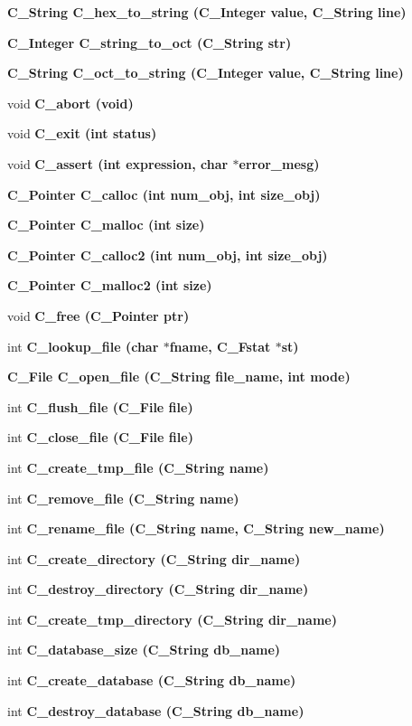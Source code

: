 \begin{CompactItemize}
\bf{C\_\-String} \bf{C\_\-hex\_\-to\_\-string} (\bf{C\_\-Integer} value, \bf{C\_\-String} line)
\item 
\bf{C\_\-Integer} \bf{C\_\-string\_\-to\_\-oct} (\bf{C\_\-String} str)
\item 
\bf{C\_\-String} \bf{C\_\-oct\_\-to\_\-string} (\bf{C\_\-Integer} value, \bf{C\_\-String} line)
\item 
void \bf{C\_\-abort} (void)
\item 
void \bf{C\_\-exit} (int status)
\item 
void \bf{C\_\-assert} (int expression, char $\ast$error\_\-mesg)
\item 
\bf{C\_\-Pointer} \bf{C\_\-calloc} (int num\_\-obj, int size\_\-obj)
\item 
\bf{C\_\-Pointer} \bf{C\_\-malloc} (int size)
\item 
\bf{C\_\-Pointer} \bf{C\_\-calloc2} (int num\_\-obj, int size\_\-obj)
\item 
\bf{C\_\-Pointer} \bf{C\_\-malloc2} (int size)
\item 
void \bf{C\_\-free} (\bf{C\_\-Pointer} ptr)
\item 
int \bf{C\_\-lookup\_\-file} (char $\ast$\bf{fname}, \bf{C\_\-Fstat} $\ast$st)
\item 
\bf{C\_\-File} \bf{C\_\-open\_\-file} (\bf{C\_\-String} file\_\-name, int \bf{mode})
\item 
int \bf{C\_\-flush\_\-file} (\bf{C\_\-File} \bf{file})
\item 
int \bf{C\_\-close\_\-file} (\bf{C\_\-File} \bf{file})
\item 
int \bf{C\_\-create\_\-tmp\_\-file} (\bf{C\_\-String} \bf{name})
\item 
int \bf{C\_\-remove\_\-file} (\bf{C\_\-String} \bf{name})
\item 
int \bf{C\_\-rename\_\-file} (\bf{C\_\-String} \bf{name}, \bf{C\_\-String} new\_\-name)
\item 
int \bf{C\_\-create\_\-directory} (\bf{C\_\-String} dir\_\-name)
\item 
int \bf{C\_\-destroy\_\-directory} (\bf{C\_\-String} dir\_\-name)
\item 
int \bf{C\_\-create\_\-tmp\_\-directory} (\bf{C\_\-String} dir\_\-name)
\item 
int \bf{C\_\-database\_\-size} (\bf{C\_\-String} db\_\-name)
\item 
int \bf{C\_\-create\_\-database} (\bf{C\_\-String} db\_\-name)
\item 
int \bf{C\_\-destroy\_\-database} (\bf{C\_\-String} db\_\-name)

\end{CompactItemize}
